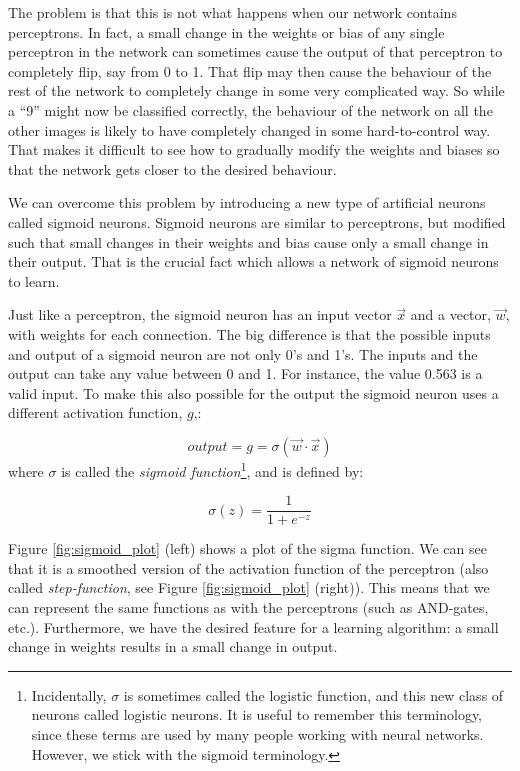 The problem is that this is not what happens when our network contains perceptrons. In fact, a small change in the weights or bias of any single perceptron in the network can sometimes cause the output of that perceptron to completely flip, say from 0
to 1. That flip may then cause the behaviour of the rest of the network to completely change in some very complicated way. So while a ``9'' might now be classified correctly, the behaviour of the network on all the other images is likely to have completely changed in some hard-to-control way. That makes it difficult to see how to gradually modify the weights and biases so that the network gets closer to the desired behaviour.

We can overcome this problem by introducing a new type of artificial neurons called sigmoid neurons. Sigmoid neurons are similar to perceptrons, but modified such that small changes in their weights and bias cause only a small change in their output. That is the crucial fact which allows a network of sigmoid neurons to learn.

Just like a perceptron, the sigmoid neuron has an input vector $\vec{x}$ and a vector, $\vec{w}$, with weights for each connection. The big difference is that the possible inputs and output of a sigmoid neuron are not only 0's and 1's. The inputs and the output can take any value between 0 and 1. For instance, the value 0.563 is a valid input. To make this also possible for the output the sigmoid neuron uses a different activation function, $g$,:

\begin{equation}
\mathit{output} = g = \sigma(\vec{w} \cdot \vec{x})
\label{eq:AF_sigmoid_withbiasasweight}
\end{equation}
where $\sigma$ is called the \textit{sigmoid function}\footnote{Incidentally, $\sigma$ is sometimes called the logistic function, and this new class of neurons called logistic neurons. It is useful to remember this terminology, since these terms are used by many people working with neural networks. However, we stick with the sigmoid terminology.}, and is defined by:

\begin{equation}
\sigma(z) = \frac{1}{1+e^{-z}}
\label{eq:sigma_function}
\end{equation}

Figure \ref{fig:sigmoid_plot} (left) shows a plot of the sigma function. We can see that it is a smoothed version of the activation function of the perceptron (also called \textit{step-function}, see Figure \ref{fig:sigmoid_plot} (right)). This means that we can represent the same functions as with the perceptrons (such as AND-gates, etc.). Furthermore, we have the desired feature for a learning algorithm: a small change in weights results in a small change in output.

